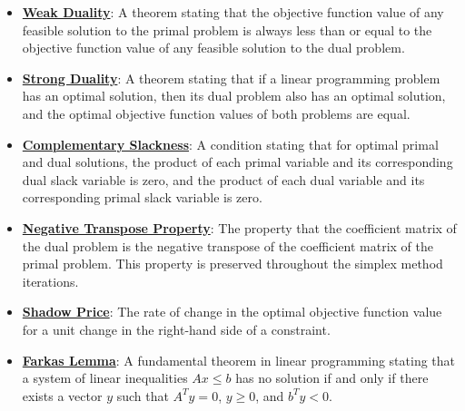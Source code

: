 \documentclass{article}%
\begin{document}
\begin{itemize}[leftmargin=*]
\item \href{https://www.math.purdue.edu/~yipn/421//2024-09-12-Duality.pdf#page=2}{\textbf{Weak Duality}}: A theorem stating that the objective function value of any feasible solution to the primal problem is always less than or equal to the objective function value of any feasible solution to the dual problem.%
\item \href{https://www.math.purdue.edu/~yipn/421//2024-09-12-Duality.pdf#page=11}{\textbf{Strong Duality}}: A theorem stating that if a linear programming problem has an optimal solution, then its dual problem also has an optimal solution, and the optimal objective function values of both problems are equal.%
\item \href{https://www.math.purdue.edu/~yipn/421//2024-09-12-Duality.pdf#page=5}{\textbf{Complementary Slackness}}: A condition stating that for optimal primal and dual solutions, the product of each primal variable and its corresponding dual slack variable is zero, and the product of each dual variable and its corresponding primal slack variable is zero.%
\item \href{https://www.math.purdue.edu/~yipn/421//2024-09-12-Duality.pdf#page=6}{\textbf{Negative Transpose Property}}: The property that the coefficient matrix of the dual problem is the negative transpose of the coefficient matrix of the primal problem. This property is preserved throughout the simplex method iterations.%
\item \href{https://www.math.purdue.edu/~yipn/421//2024-10-01-SensitivityDuality.pdf#page=10}{\textbf{Shadow Price}}: The rate of change in the optimal objective function value for a unit change in the right-hand side of a constraint.%
\item \href{https://www.math.purdue.edu/~yipn/421//2024-10-28-Farkas.pdf#page=1}{\textbf{Farkas Lemma}}: A fundamental theorem in linear programming stating that a system of linear inequalities $Ax \le b$ has no solution if and only if there exists a vector $y$ such that $A^T y = 0$, $y \ge 0$, and $b^T y < 0$.%
\end{itemize}

%
\end{document}
